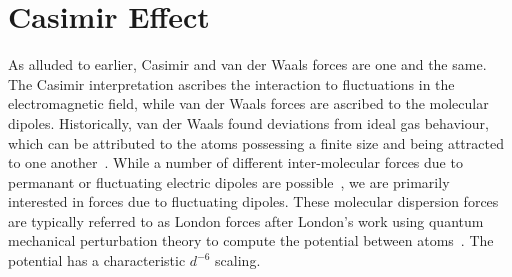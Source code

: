 

\section{Casimir Effect}

As alluded to earlier, Casimir and van der Waals forces are one and the same.  The Casimir
interpretation ascribes the interaction to fluctuations in the electromagnetic field, while van der 
Waals forces are ascribed to the molecular dipoles.  
Historically, van der Waals found deviations from ideal gas behaviour, which can be attributed 
to the atoms possessing a finite size and being attracted to one another~\cite{vanderWaals,Parsegian2006}.
While a number of different inter-molecular forces due to permanant
 or fluctuating electric dipoles are possible~\cite{Israelachvili2011},
we are primarily interested in forces due to fluctuating dipoles.  
These molecular dispersion forces are typically referred to as London forces after London's work
 using quantum mechanical perturbation theory to compute the potential between atoms~\cite{London1930}.  
The potential has a characteristic $d^{-6}$ scaling.  

